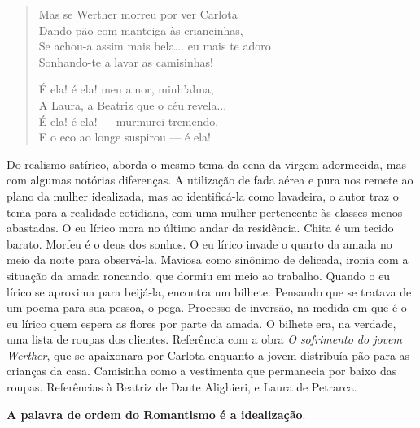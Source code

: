 \documentclass[12pt]{book}
\begin{document}
\begin{verse}
						Mas se Werther morreu por ver Carlota \\
						Dando pão com manteiga às criancinhas, \\
						Se achou-a assim mais bela... eu mais te adoro \\
						Sonhando-te a lavar as camisinhas!
						
						É ela! é ela! meu amor, minh’alma, \\
						A Laura, a Beatriz que o céu revela... \\
						É ela! é ela! — murmurei tremendo, \\
						E o eco ao longe suspirou — é ela!
					\end{verse}
					\par Do realismo satírico, aborda o mesmo tema da cena da virgem adormecida, mas com algumas notórias diferenças. A utilização de fada aérea e pura nos remete ao plano da mulher idealizada, mas ao identificá-la como lavadeira, o autor traz o tema para a realidade cotidiana, com uma mulher pertencente às classes menos abastadas. O eu lírico mora no último andar da residência. Chita é um tecido barato. Morfeu é o deus dos sonhos. O eu lírico invade o quarto da amada no meio da noite para observá-la. Maviosa como sinônimo de delicada, ironia com a situação da amada roncando, que dormiu em meio ao trabalho. Quando o eu lírico se aproxima para beijá-la, encontra um bilhete. Pensando que se tratava de um poema para sua pessoa, o pega. Processo de inversão, na medida em que é o eu lírico quem espera as flores por parte da amada. O bilhete era, na verdade, uma lista de roupas dos clientes. Referência com a obra \textit{O sofrimento do jovem Werther}, que se apaixonara por Carlota enquanto a jovem distribuía pão para as crianças da casa. Camisinha como a vestimenta que permanecia por baixo das roupas. Referências à Beatriz de Dante Alighieri, e Laura de Petrarca.
					\par \textbf{A palavra de ordem do Romantismo é a idealização}.
\end{document}
